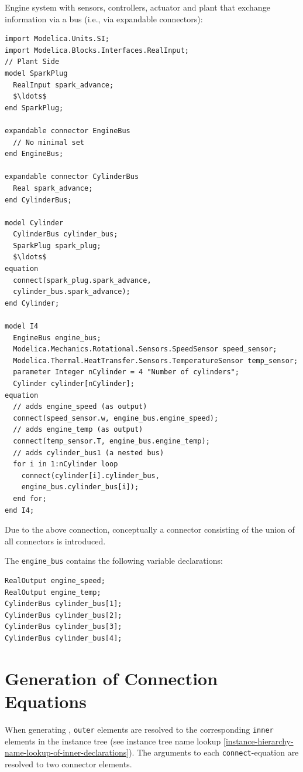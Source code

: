 \begin{example}
Engine system with sensors, controllers, actuator and plant that exchange information via a bus (i.e., via expandable connectors):
\begin{lstlisting}[language=modelica]
import Modelica.Units.SI;
import Modelica.Blocks.Interfaces.RealInput;
// Plant Side
model SparkPlug
  RealInput spark_advance;
  $\ldots$
end SparkPlug;

expandable connector EngineBus
  // No minimal set
end EngineBus;

expandable connector CylinderBus
  Real spark_advance;
end CylinderBus;

model Cylinder
  CylinderBus cylinder_bus;
  SparkPlug spark_plug;
  $\ldots$
equation
  connect(spark_plug.spark_advance,
  cylinder_bus.spark_advance);
end Cylinder;

model I4
  EngineBus engine_bus;
  Modelica.Mechanics.Rotational.Sensors.SpeedSensor speed_sensor;
  Modelica.Thermal.HeatTransfer.Sensors.TemperatureSensor temp_sensor;
  parameter Integer nCylinder = 4 "Number of cylinders";
  Cylinder cylinder[nCylinder];
equation
  // adds engine_speed (as output)
  connect(speed_sensor.w, engine_bus.engine_speed);
  // adds engine_temp (as output)
  connect(temp_sensor.T, engine_bus.engine_temp);
  // adds cylinder_bus1 (a nested bus)
  for i in 1:nCylinder loop
    connect(cylinder[i].cylinder_bus,
    engine_bus.cylinder_bus[i]);
  end for;
end I4;
\end{lstlisting}
Due to the above connection, conceptually a connector consisting of the union of all connectors is introduced.

The \lstinline!engine_bus! contains the following variable declarations:
\begin{lstlisting}[language=modelica]
RealOutput engine_speed;
RealOutput engine_temp;
CylinderBus cylinder_bus[1];
CylinderBus cylinder_bus[2];
CylinderBus cylinder_bus[3];
CylinderBus cylinder_bus[4];
\end{lstlisting}
\end{example}

\section{Generation of Connection Equations}\label{generation-of-connection-equations}

When generating , \lstinline!outer! elements are resolved to the corresponding \lstinline!inner! elements in the instance tree (see instance tree name lookup \cref{instance-hierarchy-name-lookup-of-inner-declarations}).
The arguments to each \lstinline!connect!-equation are resolved to two connector elements.


